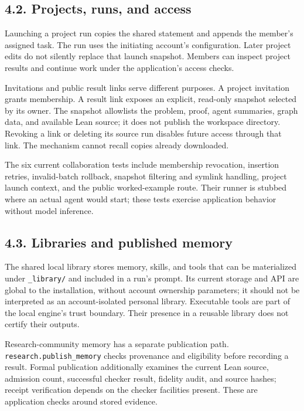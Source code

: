 \documentclass[11pt,a4paper]{article}
\begin{document}
\subsection*{4.2. Projects, runs, and access}

Launching a project run copies the shared statement and appends the member's assigned task. The run uses the initiating account's configuration. Later project edits do not silently replace that launch snapshot. Members can inspect project results and continue work under the application's access checks.

Invitations and public result links serve different purposes. A project invitation grants membership. A result link exposes an explicit, read-only snapshot selected by its owner. The snapshot allowlists the problem, proof, agent summaries, graph data, and available Lean source; it does not publish the workspace directory. Revoking a link or deleting its source run disables future access through that link. The mechanism cannot recall copies already downloaded.

The six current collaboration tests include membership revocation, insertion retries, invalid-batch rollback, snapshot filtering and symlink handling, project launch context, and the public worked-example route. Their runner is stubbed where an actual agent would start; these tests exercise application behavior without model inference.

\subsection*{4.3. Libraries and published memory}

The shared local library stores memory, skills, and tools that can be materialized under \nolinkurl{_library/} and included in a run's prompt. Its current storage and API are global to the installation, without account ownership parameters; it should not be interpreted as an account-isolated personal library. Executable tools are part of the local engine's trust boundary. Their presence in a reusable library does not certify their outputs.

Research-community memory has a separate publication path. \nolinkurl{research.publish_memory} checks provenance and eligibility before recording a result. Formal publication additionally examines the current Lean source, admission count, successful checker result, fidelity audit, and source hashes; receipt verification depends on the checker facilities present. These are application checks around stored evidence.
\end{document}
